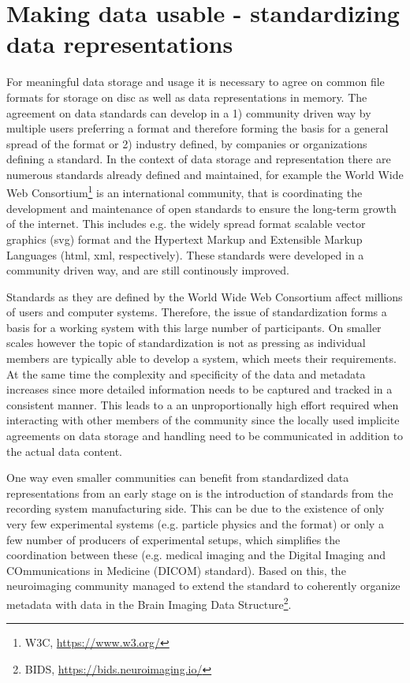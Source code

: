 \clearpage
\chapter[Data Representation]{Making data usable - standardizing data representations}
\label{sec:neo}
For meaningful data storage and usage it is necessary to agree on common file formats for storage on disc as well as data representations in memory. The agreement on data standards can develop in a 1) community driven way by multiple users preferring a format and therefore forming the basis for a general spread of the format or 2) industry defined, by companies or organizations defining a standard. In the context of data storage and representation there are numerous standards already defined and maintained, for example the World Wide Web Consortium\footnote{W3C, \url{https://www.w3.org/}} is an international community, that is coordinating the development and maintenance of open standards to ensure the long-term growth of the internet. This includes e.g. the widely spread format scalable vector graphics (svg) format and the Hypertext Markup and Extensible Markup Languages (html, xml, respectively). These standards were developed in a community driven way, and are still continously improved.

Standards as they are defined by the World Wide Web Consortium affect millions of users and computer systems. Therefore, the issue of standardization forms a basis for a working system with this large number of participants. On smaller scales however the topic of standardization is not as pressing as individual members are typically able to develop a system, which meets their requirements. At the same time the complexity and specificity of the data and metadata increases since more detailed information needs to be captured and tracked in a consistent manner. This leads to a an unproportionally high effort required when  interacting with other members of the community since the locally used implicite agreements on data storage and handling need to be communicated in addition to the actual data content.

One way even smaller communities can benefit from standardized data representations from an early stage on is the introduction of standards from the recording system manufacturing side. This can be due to the existence of only very few experimental systems (e.g. particle physics and the  format) or only a few number of producers of experimental setups, which simplifies the coordination between these (e.g. medical imaging and the Digital Imaging and COmmunications in Medicine (DICOM) standard). Based on this, the neuroimaging community managed to extend the standard to coherently organize metadata with data in the Brain Imaging Data Structure\footnote{BIDS, \url{https://bids.neuroimaging.io/}}.

